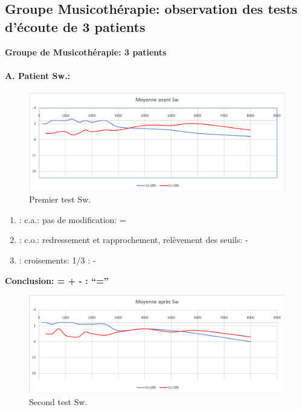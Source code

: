 \subsection{Groupe Musicothérapie: observation des tests d'écoute de 3 patients}
  \textbf{Groupe de Musicothérapie: 3 patients}

\paragraph{ A. Patient Sw.:}



 \begin{figure}[th]
\centering
\includegraphics[width=1\linewidth]{images/graphiques/sw_pre.png}
\caption[ \textbf{Groupe Musicothérapie}: Patient A. : 1°Test]{Premier test Sw.}

\end{figure}

	\begin{enumerate}

 		\item : c.a.: pas de modification: = %

 		\item : c.o.: redressement et rapprochement,
                  relèvement des seuils: -       %
 		\item : croisements: 1/3 :  -

                \end{enumerate}

                \textbf{  Conclusion:  = +  -        : ``=''}

                \begin{figure}[th]
\centering
\includegraphics[width=1\linewidth]{images/graphiques/sw_post.png}
\caption[Patient A. : 2° test]{Second test Sw.}

\end{figure}




